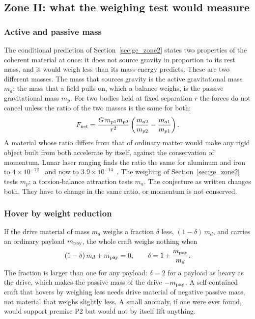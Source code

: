 \subsection{Zone II: what the weighing test would measure}\label{sec:pr_weigh}

\subsubsection{Active and passive mass}
The conditional prediction of Section~\ref{sec:ge_zone2} states two properties of the coherent material at once: it does not source gravity in
proportion to its rest mass, and it would weigh less than its mass-energy predicts. These are two different masses. The mass that sources gravity is
the active gravitational mass $m_a$; the mass that a field pulls on, which a balance weighs, is the passive gravitational mass $m_p$. For two bodies
held at fixed separation $r$ the forces do not cancel unless the ratio of the two masses is the same for both:
\begin{equation}
F_{\rm net}=\frac{G\,m_{p1}m_{p2}}{r^2}\left(\frac{m_{a2}}{m_{p2}}-\frac{m_{a1}}{m_{p1}}\right) .
\label{eq:pr_selfforce}
\end{equation}
\derived{} A material whose ratio differs from that of ordinary matter would make any rigid object built from both accelerate by itself, against the
conservation of momentum. Lunar laser ranging finds the ratio the same for aluminum and iron to $4\times10^{-12}$~\cite{BartlettVanBuren1986} and
now to $3.9\times10^{-14}$~\cite{Singh2023}. \observed{} The weighing of Section~\ref{sec:ge_zone2} tests $m_p$; a torsion-balance attraction tests
$m_a$. The conjecture as written changes both. \conjecture{} They have to change in the same ratio, or momentum is not conserved. \derived

\subsubsection{Hover by weight reduction}
If the drive material of mass $m_d$ weighs a fraction $\delta$ less, $(1-\delta)\,m_d$, and carries an ordinary payload $m_{\rm pay}$, the whole
craft weighs nothing when
\begin{equation}
(1-\delta)\,m_d+m_{\rm pay}=0,\qquad \delta=1+\frac{m_{\rm pay}}{m_d} .
\label{eq:pr_hover}
\end{equation}
\derived{} The fraction is larger than one for any payload: $\delta=2$ for a payload as heavy as the drive, which makes the passive mass of the drive
$-m_{\rm pay}$. A self-contained craft that hovers by weighing less needs drive material of negative passive mass, not material that weighs slightly
less. \derived{} A small anomaly, if one were ever found, would support premise P2 but would not by itself lift anything. \conjecture

